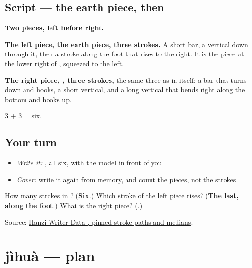 \subsection*{Script — the earth piece, then }

\begin{quote}
\end{quote}

\textbf{Two pieces, left before right.}

\textbf{The left piece, the earth piece, three strokes.} A short bar, a vertical down through it, then a stroke along the foot that rises to the right. It is the piece at the lower right of , squeezed to the left.

\textbf{The right piece, , three strokes,} the same three as in  itself: a bar that turns down and hooks, a short vertical, and a long vertical that bends right along the bottom and hooks up.

3 + 3 = six.

\subsection*{Your turn}
\begin{itemize}
\raggedright
  \item \emph{Write it:} , all six, with the model in front of you
  \item \emph{Cover:} write it again from memory, and count the pieces, not the strokes
\end{itemize}

\begin{tcolorbox}[breakable,colback=teal!4,colframe=teal!35!black,title={Before you move on}]
How many strokes in ? (\textbf{Six}.) Which stroke of the left piece rises? (\textbf{The last, along the foot}.) What is the right piece? (\textbf{}.)

Source: \href{https://raw.githubusercontent.com/chanind/hanzi-writer-data/68d10a4b21150cae5e1ebbd223eed289cf32d90c/data/\%E5\%9C\%B0.json}{Hanzi Writer Data , pinned stroke paths and medians}.
\end{tcolorbox}
\section[jìhuà]{jìhuà — plan}

\label{lesson:ZH-C207-jihua}




